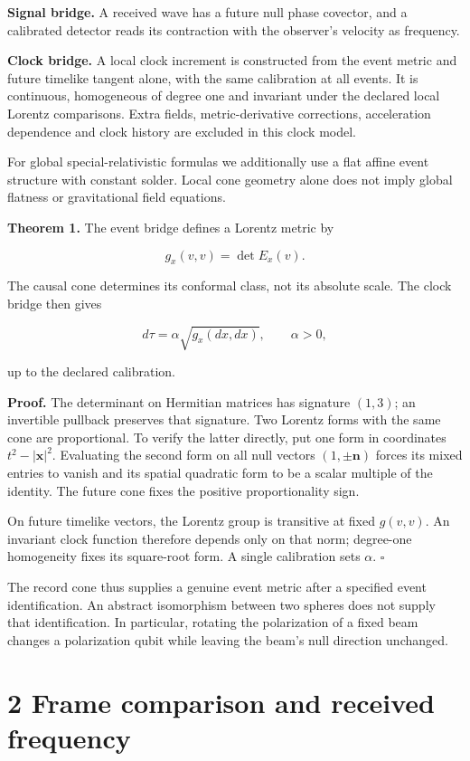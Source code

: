 \documentclass[
  11pt,
  a4paper,
]{article}
\begin{document}
\textbf{Signal bridge.} A received wave has a future null phase covector, and a calibrated detector reads its contraction with the observer's velocity as frequency.

\textbf{Clock bridge.} A local clock increment is constructed from the event metric and future timelike tangent alone, with the same calibration at all events. It is continuous, homogeneous of degree one and invariant under the declared local Lorentz comparisons. Extra fields, metric-derivative corrections, acceleration dependence and clock history are excluded in this clock model.

For global special-relativistic formulas we additionally use a flat affine event structure with constant solder. Local cone geometry alone does not imply global flatness or gravitational field equations.

\textbf{Theorem 1.} The event bridge defines a Lorentz metric by

\[g_x(v,v)=\det E_x(v).\]

The causal cone determines its conformal class, not its absolute scale. The clock bridge then gives

\[d\tau=\alpha\sqrt{g_x(dx,dx)},\qquad\alpha>0,\]

up to the declared calibration.

\textbf{Proof.} The determinant on Hermitian matrices has signature \((1,3)\); an invertible pullback preserves that signature. Two Lorentz forms with the same cone are proportional. To verify the latter directly, put one form in coordinates \(t^2-|\mathbf x|^2\). Evaluating the second form on all null vectors \((1,\pm\mathbf n)\) forces its mixed entries to vanish and its spatial quadratic form to be a scalar multiple of the identity. The future cone fixes the positive proportionality sign.

On future timelike vectors, the Lorentz group is transitive at fixed \(g(v,v)\). An invariant clock function therefore depends only on that norm; degree-one homogeneity fixes its square-root form. A single calibration sets \(\alpha\). \(\square\)

The record cone thus supplies a genuine event metric after a specified event identification. An abstract isomorphism between two spheres does not supply that identification. In particular, rotating the polarization of a fixed beam changes a polarization qubit while leaving the beam's null direction unchanged.

\section{2 Frame comparison and received frequency}\label{frame-comparison-and-received-frequency}
\end{document}
